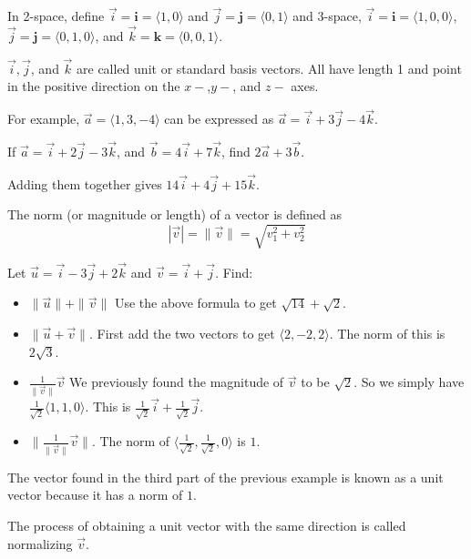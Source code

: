 \documentclass[../calc3.tex]{subfiles}
\begin{document}
In 2-space, define $\vec{i}=\textbf{i}=\langle 1,0\rangle$ and $\vec{j}=\textbf{j}=\langle 0,1\rangle$ and 3-space, $\vec{i}=\textbf{i}=\langle 1,0,0\rangle$, $\vec{j}=\textbf{j}
=\langle 0,1,0\rangle$, and $\vec{k}=\textbf{k}=\langle 0,0,1\rangle$.

$\vec{i},\vec{j}$, and $\vec{k}$ are called unit or standard basis vectors. All have length 1 and point in the positive direction on the $x-$,$y-$, and $z-$ axes.

For example, $\vec{a}=\langle 1,3,-4\rangle$ can be expressed as $\vec{a}=\vec{i}+3\vec{j}-4\vec{k}$.

\begin{example}
    If $\vec{a}=\vec{i}+2\vec{j}-3\vec{k}$, and $\vec{b}=4\vec{i}+7\vec{k}$, find $2\vec{a}+3\vec{b}$.

    Adding them together gives $14\vec{i}+4\vec{j}+15\vec{k}$.
\end{example}

The norm (or magnitude or length) of a vector is defined as 
\[ |\vec{v}|=\|\vec{v}\|=\sqrt{v_1^2 + v_2^2} \]

\begin{example}
    Let $\vec{u}=\vec{i}-3\vec{j}+2\vec{k}$ and $\vec{v}=\vec{i}+\vec{j}$. Find: 
    \begin{itemize}
        \item $\|\vec{u}\|+\|\vec{v}\|$
        Use the above formula to get $\sqrt{14}+\sqrt{2}$.

        \item $\|\vec{u}+\vec{v}\|$.
        First add the two vectors to get $\langle 2,-2,2\rangle$. The norm of this is $2\sqrt{3}$.

        \item $\frac{1}{\|\vec{v}\|}\vec{v}$
        We previously found the magnitude of $\vec{v}$ to be $\sqrt{2}$. So we simply have $\frac{1}{\sqrt{2}}\langle 1,1,0\rangle$. This is $\frac{1}{\sqrt{2}}\vec{i}+\frac{1}{\sqrt{2}}\vec{j}$.
    
        \item $\|\frac{1}{\|\vec{v}\|}\vec{v}\|$.
        The norm of $\langle \frac{1}{\sqrt{2}},\frac{1}{\sqrt{2}},0\rangle$ is $1$.
    \end{itemize}
\end{example}
The vector found in the third part of the previous example is known as a unit vector because it has a norm of $1$.

The process of obtaining a unit vector with the same direction is called normalizing $\vec{v}$.
\end{document}

